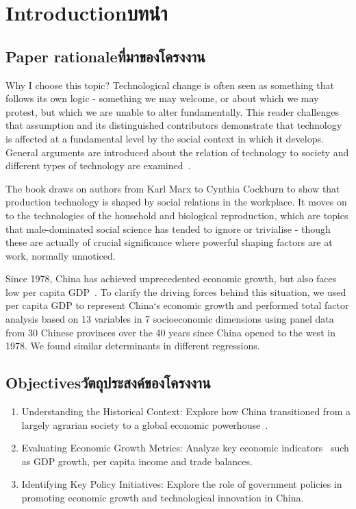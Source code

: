 \chapter{\ifenglish Introduction\else บทนำ\fi}

\section{\ifenglish Paper rationale\else ที่มาของโครงงาน\fi}

Why I choose this topic? Technological change is often seen as something that 
follows its own logic - something we may welcome, or about which we may protest, 
but which we are unable to alter fundamentally. This reader challenges that 
assumption and its distinguished contributors demonstrate that technology is 
affected at a fundamental level by the social context in which it develops. 
General arguments are introduced about the relation of technology to society 
and different types of technology are examined~\cite{mackenzie2011social}.

The book draws on authors from Karl Marx to Cynthia Cockburn to show that 
production technology is shaped by social relations in the workplace. It moves 
on to the technologies of the household and biological reproduction, which are 
topics that male-dominated social science has tended to ignore or trivialise - 
though these are actually of crucial significance where powerful shaping factors 
are at work, normally unnoticed.

Since 1978, China has achieved unprecedented economic growth, but also faces low 
per capita GDP~\cite{GUO2022100982}. To clarify the driving forces behind this situation, we used per 
capita GDP to represent China`s economic growth and performed total factor 
analysis based on 13 variables in 7 socioeconomic dimensions using panel data 
from 30 Chinese provinces over the 40 years since China opened to the west in 
1978. We found similar determinants in different regressions.


\section{\ifenglish Objectives\else วัตถุประสงค์ของโครงงาน\fi}
\begin{enumerate}
    \item Understanding the Historical Context: Explore how China transitioned 
    from a largely agrarian society to a global economic powerhouse~\cite{academicoup}.
    \item Evaluating Economic Growth Metrics: Analyze key economic indicators~\cite{EconGrowthAnalyze}
    such as GDP growth, per capita income and trade balances.
    \item Identifying Key Policy Initiatives: Explore the role of government 
    policies in promoting economic growth and technological innovation in China.
\end{enumerate}

